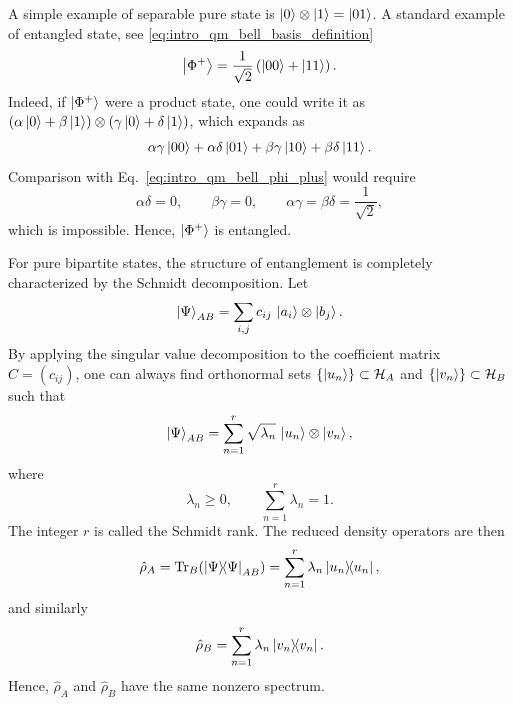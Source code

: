 A simple example of separable pure state is $\ket{0}\otimes\ket{1}=\ket{01}$. A standard example of entangled state, see \eqref{eq:intro_qm_bell_basis_definition}
\begin{equation}
	\ket{\Phi^+}
	=
	\frac{1}{\sqrt{2}}\left(\ket{00}+\ket{11}\right).
	\label{eq:intro_qm_bell_phi_plus}
\end{equation}
Indeed, if $\ket{\Phi^+}$ were a product state, one could write it as $(\alpha\ket{0}+\beta\ket{1})\otimes(\gamma\ket{0}+\delta\ket{1})$, which expands as
\begin{equation}
	\alpha\gamma\ket{00}
	+
	\alpha\delta\ket{01}
	+
	\beta\gamma\ket{10}
	+
	\beta\delta\ket{11}.
	\label{eq:intro_qm_product_state_expansion_for_phi_plus_explicit}
\end{equation}
Comparison with Eq.~\eqref{eq:intro_qm_bell_phi_plus} would require
\begin{equation}
	\alpha\delta=0,
	\qquad
	\beta\gamma=0,
	\qquad
	\alpha\gamma=\beta\delta=\frac{1}{\sqrt{2}},
	\label{eq:intro_qm_phi_plus_factorization_conditions}
\end{equation}
which is impossible. Hence, $\ket{\Phi^+}$ is entangled.

For pure bipartite states, the structure of entanglement is completely characterized by the Schmidt decomposition. Let
\begin{equation}
	\ket{\Psi}_{AB}
	=
	\sum_{i,j} c_{ij}\,\ket{a_i}\otimes\ket{b_j}.
	\label{eq:intro_qm_generic_bipartite_state_for_schmidt}
\end{equation}
By applying the singular value decomposition to the coefficient matrix $C=(c_{ij})$, one can always find orthonormal sets $\{\ket{u_n}\}\subset\mathcal{H}_A$ and $\{\ket{v_n}\}\subset\mathcal{H}_B$ such that
\begin{equation}
	\ket{\Psi}_{AB}
	=
	\sum_{n=1}^{r} \sqrt{\lambda_n}\,\ket{u_n}\otimes\ket{v_n},
	\label{eq:intro_qm_schmidt_decomposition}
\end{equation}
where
\begin{equation}
	\lambda_n\geq 0,
	\qquad
	\sum_{n=1}^{r}\lambda_n=1.
	\label{eq:intro_qm_schmidt_coefficients_properties}
\end{equation}
The integer $r$ is called the Schmidt rank. The reduced density operators are then
\begin{equation}
	\hat \rho_A
	=
	\Tr_B\!\left(\dyad{\Psi}{\Psi}_{AB}\right)
	=
	\sum_{n=1}^{r}\lambda_n \dyad{u_n}{u_n},
	\label{eq:intro_qm_reduced_state_schmidt_A}
\end{equation}
and similarly
\begin{equation}
	\hat \rho_B
	=
	\sum_{n=1}^{r}\lambda_n \dyad{v_n}{v_n}.
	\label{eq:intro_qm_reduced_state_schmidt_B}
\end{equation}
Hence, $\hat \rho_A$ and $\hat \rho_B$ have the same nonzero spectrum.

